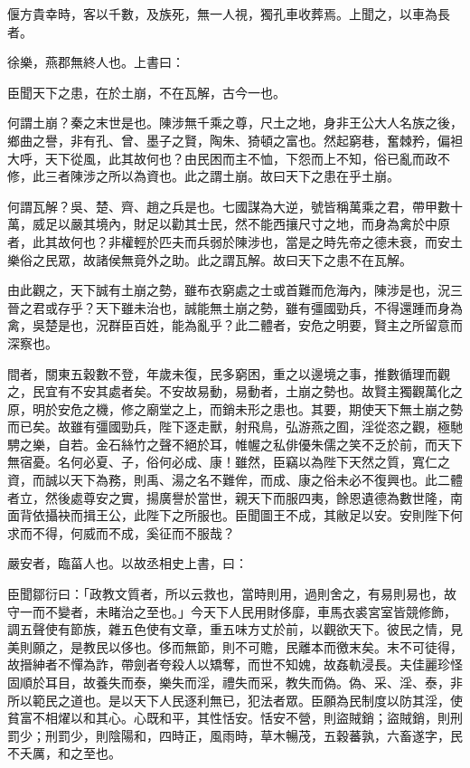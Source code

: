 \begin{pinyinscope}
偃方貴幸時，客以千數，及族死，無一人視，獨孔車收葬焉。上聞之，以車為長者。

徐樂，燕郡無終人也。上書曰：

臣聞天下之患，在於土崩，不在瓦解，古今一也。

何謂土崩？秦之末世是也。陳涉無千乘之尊，尺土之地，身非王公大人名族之後，鄉曲之譽，非有孔、曾、墨子之賢，陶朱、猗頓之富也。然起窮巷，奮棘矜，偏袒大呼，天下從風，此其故何也？由民困而主不恤，下怨而上不知，俗已亂而政不修，此三者陳涉之所以為資也。此之謂土崩。故曰天下之患在乎土崩。

何謂瓦解？吳、楚、齊、趙之兵是也。七國謀為大逆，號皆稱萬乘之君，帶甲數十萬，威足以嚴其境內，財足以勸其士民，然不能西攘尺寸之地，而身為禽於中原者，此其故何也？非權輕於匹夫而兵弱於陳涉也，當是之時先帝之德未衰，而安土樂俗之民眾，故諸侯無竟外之助。此之謂瓦解。故曰天下之患不在瓦解。

由此觀之，天下誠有土崩之勢，雖布衣窮處之士或首難而危海內，陳涉是也，況三晉之君或存乎？天下雖未治也，誠能無土崩之勢，雖有彊國勁兵，不得還踵而身為禽，吳楚是也，況群臣百姓，能為亂乎？此二體者，安危之明要，賢主之所留意而深察也。

間者，關東五穀數不登，年歲未復，民多窮困，重之以邊境之事，推數循理而觀之，民宜有不安其處者矣。不安故易動，易動者，土崩之勢也。故賢主獨觀萬化之原，明於安危之機，修之廟堂之上，而銷未形之患也。其要，期使天下無土崩之勢而已矣。故雖有彊國勁兵，陛下逐走獸，射飛鳥，弘游燕之囿，淫從恣之觀，極馳騁之樂，自若。金石絲竹之聲不絕於耳，帷幄之私俳優朱儒之笑不乏於前，而天下無宿憂。名何必夏、子，俗何必成、康！雖然，臣竊以為陛下天然之質，寬仁之資，而誠以天下為務，則禹、湯之名不難侔，而成、康之俗未必不復興也。此二體者立，然後處尊安之實，揚廣譽於當世，親天下而服四夷，餘恩遺德為數世隆，南面背依攝袂而揖王公，此陛下之所服也。臣聞圖王不成，其敝足以安。安則陛下何求而不得，何威而不成，奚征而不服哉？

嚴安者，臨菑人也。以故丞相史上書，曰：

臣聞鄒衍曰：「政教文質者，所以云救也，當時則用，過則舍之，有易則易也，故守一而不變者，未睹治之至也。」今天下人民用財侈靡，車馬衣裘宮室皆競修飾，調五聲使有節族，雜五色使有文章，重五味方丈於前，以觀欲天下。彼民之情，見美則願之，是教民以侈也。侈而無節，則不可贍，民離本而徼末矣。末不可徒得，故搢紳者不憚為詐，帶劍者夸殺人以矯奪，而世不知媿，故姦軌浸長。夫佳麗珍怪固順於耳目，故養失而泰，樂失而淫，禮失而采，教失而偽。偽、采、淫、泰，非所以範民之道也。是以天下人民逐利無已，犯法者眾。臣願為民制度以防其淫，使貧富不相燿以和其心。心既和平，其性恬安。恬安不營，則盜賊銷；盜賊銷，則刑罰少；刑罰少，則陰陽和，四時正，風雨時，草木暢茂，五穀蕃孰，六畜遂字，民不夭厲，和之至也。


\end{pinyinscope}
